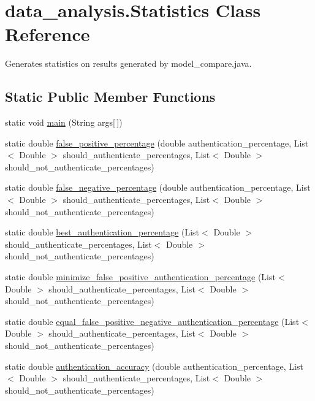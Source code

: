 \hypertarget{classdata__analysis_1_1_statistics}{}\section{data\+\_\+analysis.\+Statistics Class Reference}
\label{classdata__analysis_1_1_statistics}


Generates statistics on results generated by model\+\_\+compare.\+java.  


\subsection*{Static Public Member Functions}
\begin{DoxyCompactItemize}
\item 
static void \hyperlink{classdata__analysis_1_1_statistics_a19371eed8cab72da351f6c35762c83de}{main} (String args\mbox{[}$\,$\mbox{]})
\item 
static double \hyperlink{classdata__analysis_1_1_statistics_a0c7f157e53361c33276290383acff9b6}{false\+\_\+positive\+\_\+percentage} (double authentication\+\_\+percentage, List$<$ Double $>$ should\+\_\+authenticate\+\_\+percentages, List$<$ Double $>$ should\+\_\+not\+\_\+authenticate\+\_\+percentages)
\item 
static double \hyperlink{classdata__analysis_1_1_statistics_abcd420f8186babaf12e030180e4c458d}{false\+\_\+negative\+\_\+percentage} (double authentication\+\_\+percentage, List$<$ Double $>$ should\+\_\+authenticate\+\_\+percentages, List$<$ Double $>$ should\+\_\+not\+\_\+authenticate\+\_\+percentages)
\item 
static double \hyperlink{classdata__analysis_1_1_statistics_afb383973976b2531318be692c4894f5e}{best\+\_\+authentication\+\_\+percentage} (List$<$ Double $>$ should\+\_\+authenticate\+\_\+percentages, List$<$ Double $>$ should\+\_\+not\+\_\+authenticate\+\_\+percentages)
\item 
static double \hyperlink{classdata__analysis_1_1_statistics_a4fff292245c5c2435386e12b129c2b40}{minimize\+\_\+false\+\_\+positive\+\_\+authentication\+\_\+percentage} (List$<$ Double $>$ should\+\_\+authenticate\+\_\+percentages, List$<$ Double $>$ should\+\_\+not\+\_\+authenticate\+\_\+percentages)
\item 
static double \hyperlink{classdata__analysis_1_1_statistics_a7702c206ace91fa095d5b68a24820db2}{equal\+\_\+false\+\_\+positive\+\_\+negative\+\_\+authentication\+\_\+percentage} (List$<$ Double $>$ should\+\_\+authenticate\+\_\+percentages, List$<$ Double $>$ should\+\_\+not\+\_\+authenticate\+\_\+percentages)
\item 
static double \hyperlink{classdata__analysis_1_1_statistics_a8ca0530f61c30cf41f0500e56b6fc11a}{authentication\+\_\+accuracy} (double authentication\+\_\+percentage, List$<$ Double $>$ should\+\_\+authenticate\+\_\+percentages, List$<$ Double $>$ should\+\_\+not\+\_\+authenticate\+\_\+percentages)
\end{DoxyCompactItemize}



